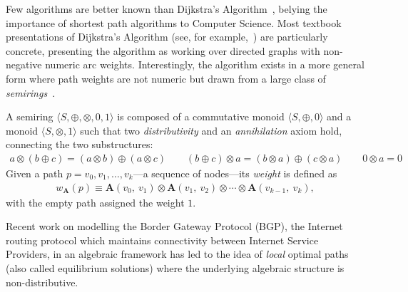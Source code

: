 Few algorithms are better known than Dijkstra's Algorithm~\cite{dijkstra:note:1959}, belying the importance of shortest path algorithms to Computer Science.
Most textbook presentations of Dijkstra's Algorithm (see, for example,~\cite[Chapter 24]{clrs}) are particularly concrete, presenting the algorithm as working over directed graphs with non-negative numeric arc weights.
Interestingly, the algorithm exists in a more general form where path weights are not numeric but drawn from a large class of \emph{semirings}~\cite{gondran_graphs_2008, mohri:semiring:2002}.


A semiring $\langle S, \oplus, \otimes, 0, 1 \rangle$ is composed of a commutative monoid $\langle S, \oplus, 0\rangle$ and a monoid $\langle S, \otimes, 1\rangle$ such that two \emph{distributivity} and an \emph{annihilation} axiom hold, connecting the two substructures:
\begin{gather*}
a\otimes (b \oplus c) = (a\otimes b) \oplus (a\otimes c) \qquad
(b \oplus c) \otimes a = (b\otimes a) \oplus (c\otimes a) \qquad
0 \otimes a = 0
\end{gather*}
\noindent
Given a path $p = v_0, v_1, \ldots, v_k$---a sequence of nodes---its \emph{weight} is defined as
\begin{gather*}
    w_{\mathbf{A}}(p)
    \equiv
    \mathbf{A}(v_0,\ v_1)
    \otimes \mathbf{A}(v_1,\ v_2)
    \otimes \cdots
    \otimes \mathbf{A}(v_{k-1},\ v_k),
\end{gather*}
with the empty path assigned the weight $1$.

Recent work on modelling the Border Gateway Protocol (BGP), the Internet routing protocol which maintains connectivity between Internet Service Providers, in an algebraic framework has led to the idea of \emph{local} optimal paths (also called equilibrium solutions) where the underlying algebraic structure is non-distributive.

